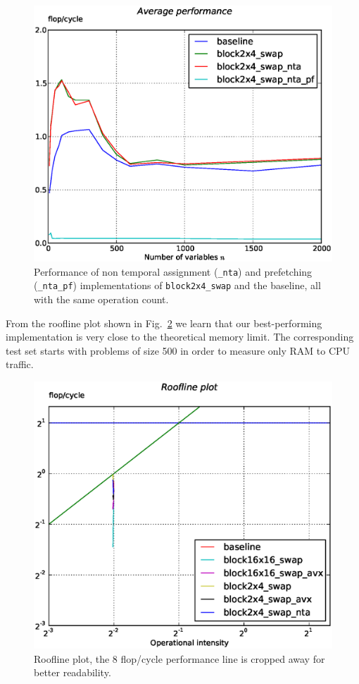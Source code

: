 \documentclass[letterpaper]{article}
\begin{document}
\begin{figure}\centering
  \includegraphics[scale=0.4]{img/results_cachecontrol_novec.eps}
  \caption{Performance of non temporal assignment ({\tt \_nta}) and prefetching ({\tt \_nta\_pf}) implementations of {\tt block2x4\_swap} and the baseline,
  all with the same operation count.\label{fig:res_cachecontrol}}
\end{figure}


From the roofline plot shown in Fig.~\ref{fig:res_roof_high} we learn that our best-performing implementation is very close to the theoretical memory limit.
The corresponding test set starts with problems of size 500 in order to measure only RAM to CPU traffic.

\begin{figure}\centering
  \includegraphics[scale=0.4]{img/roof_high_autovec.eps}
  \caption{Roofline plot, the 8 flop/cycle performance line is cropped away for better readability.\label{fig:res_roof_high}}
\end{figure}
\end{document}
